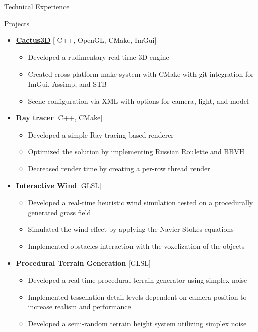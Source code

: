 \documentclass[]{mcdowellcv}
\begin{document}
	\begin{cvsection}{Technical Experience}
		 \begin{cvsubsection}{Projects}{}{}
			\begin{itemize}
				\item \href{https://github.com/goncalves-diogo/cactus3D}{\textbf{Cactus3D}} [ C++, OpenGL, CMake, ImGui]
                    \begin{itemize}
                        \item Developed a rudimentary real-time 3D engine
                        \item Created cross-platform make system with CMake with git integration for ImGui, Assimp, and STB
                        \item Scene configuration via XML with options for camera, light, and model
                    \end{itemize}
				\item \href{https://github.com/goncalves-diogo/PathTracer}{\textbf{Ray tracer}} [C++, CMake]
                    \begin{itemize}
                        \item Developed a simple Ray tracing based renderer
                        \item Optimized the solution by implementing Russian Roulette and BBVH
                        \item Decreased render time by creating a per-row thread render
                    \end{itemize}	
		        \item \href{https://github.com/maacarvalho/interactive-wind}{\textbf{Interactive Wind}} [GLSL]
                  \begin{itemize}
                      \item Developed a real-time heuristic wind simulation tested on a procedurally generated grass field
                      \item Simulated the wind effect by applying the Navier-Stokes equations
                      \item Implemented obstacles interaction with the voxelization of the objects
                  \end{itemize}
                \item \href{https://github.com/maacarvalho/procedural-terrain-generation}{\textbf{Procedural Terrain Generation}} [GLSL]
                \begin{itemize}
                    \item Developed a real-time procedural terrain generator using simplex noise
                    \item Implemented tessellation detail levels dependent on camera position to increase realism and performance
                    \item Developed a semi-random terrain height system utilizing simplex noise
                \end{itemize}                
                
			\end{itemize}
		\end{cvsubsection}
	\end{cvsection}
\end{document}
